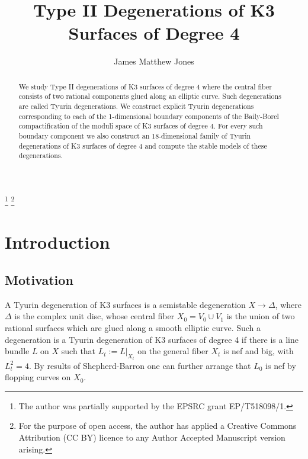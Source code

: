 \documentclass[a4paper]{amsart}
\theoremstyle{definition}
\theoremstyle{plain}
\theoremstyle{remark}
\begin{document}


\title{Type II Degenerations of K3 Surfaces of Degree 4}

\author[J. M. Jones]{James Matthew Jones}
\address{Department of Mathematical Sciences, Loughborough University, Loughborough, Leicestershire, LE11 3TU, United Kingdom.}
\thanks{The author was partially supported by the EPSRC grant EP/T518098/1.}
\thanks{For the purpose of open access, the author has applied a Creative Commons Attribution (CC BY) licence to any Author Accepted Manuscript version arising.}

\begin{abstract}
We study Type II degenerations of K3 surfaces of degree 4 where the central fiber consists of two rational components glued along an elliptic curve. Such degenerations are called Tyurin degenerations. We construct explicit Tyurin degenerations corresponding to each of the 1-dimensional boundary components of the Baily-Borel compactification of the moduli space of K3 surfaces of degree 4.
For every such boundary component we also construct an 18-dimensional family of Tyurin degenerations of K3 surfaces of degree 4 and compute the stable models of these degenerations.
\end{abstract}
\date{}
\maketitle
\section{Introduction}
\subsection{Motivation}

A Tyurin degeneration of K3 surfaces is a semistable degeneration $X\rightarrow \Delta $, where $\Delta$ is the complex unit disc, whose central fiber $X_0=V_0\cup V_1$ is the union of two rational surfaces which are glued along a smooth elliptic curve. Such a degeneration is a Tyurin degeneration of K3 surfaces of degree 4 if there is a line bundle $L$ on $X$ such that $L_t:=L|_{X_t}$ on the general fiber $X_t$ is nef and big, with $L_t^2=4$. By results of Shepherd-Barron \cite{SB83} one can further arrange that $L_0$ is nef by flopping curves on $X_0$.
\end{document}
